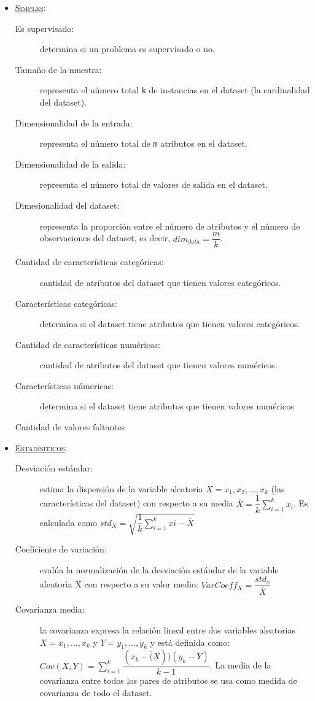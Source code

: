 \begin{itemize}
	\item \underline{\textsc{Simples}}: \begin{description}
		\item[Es supervisado:] determina si un problema es supervisado o no.
		\item[Tamaño de la muestra:] representa el número total \texttt{k} de instancias en el dataset (la cardinalidad del dataset).
		\item[Dimensionalidad de la entrada:] representa el número total de \texttt{m} atributos en el dataset.
		\item[Dimensionalidad de la salida:] representa el número total de valores de salida en el dataset.
		\item[Dimesionalidad del dataset:] representa la proporción entre el número de atributos y el número de observaciones del dataset, es decir, $dim_{data} = \dfrac{m}{k}$.
		\item[Cantidad de características categóricas:] cantidad de atributos del dataset que tienen valores categóricos.
		\item[Características categóricas:] determina si el dataset tiene atributos que tienen valores categóricos.
		\item[Cantidad de características numéricas:] cantidad de atributos del dataset que tienen valores numéricos.
		\item[Características númericas:] determina si el dataset tiene atributos que tienen valores numéricos
		\item[Cantidad de valores faltantes]
	\end{description}
	\item \underline{\textsc{Estadísiticos}}: \begin{description}
		\item[Desviación estándar:] estima la dispersión de la variable aleatoria $X = x_1, x_2, ..., x_k$ (las características del dataset) con respecto a su media $\overline{X} = \dfrac{1}{k}\sum^k_{i=1}x_i$. Es calculada como $std_X = \sqrt{\dfrac{1}{k}\sum^k_{i=1}xi - \overline{X}}$
		\item[Coeficiente de variación:] evalúa la normalización de la desviación estándar de la variable aleatoria X con respecto a su valor medio: $VarCoeff_X =  \dfrac{std_x}{\overline{X}}$
		\item[Covarianza media:] la covarianza expresa la relación lineal entre dos variables aleatorias $X = x_1, ..., x_k$ y $Y = y_1, ..., y_k$ y está definida como: $Cov(X, Y) = \sum^k_{i=1} \dfrac{(x_k - \overline(X))(y_k - \overline{Y})}{k-1}$. La media de la covarianza entre todos los pares de atributos se usa como medida de covarianza de todo el dataset.

\end{description}
\end{itemize}

